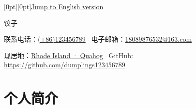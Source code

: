 \documentclass[a4paper,10pt]{article}
\begin{document}
\hspace*{-2.5em} 
\vspace*{2.5em}
\raisebox{0pt}[0pt][0pt]{\hyperref[english-version]{\small{Jump to English version}}}
\vspace*{-\baselineskip}

\centerline{\Huge{\kaishu 饺子}}
\vspace{0.5em}
\label{中文版}
\centerline{{联系电话：\href{tel:(+86)123456789}{(+86)123456789} 
\textperiodcentered \  电子邮箱：\href{mailto:18089876532@163.com}{18089876532@163.com}}}
\centerline{{现居地：\href{https://ditu.amap.com/search?query=Rhode Island · Quahog}{Rhode Island · Quahog}
\textperiodcentered \ GitHub: \href{https://github.com/dumplings123456789}{https://github.com/dumplings123456789}}}
\hfill {}

\section*{\textbf{个人简介}}
 
\subsection*{}
\subsection*{}
\end{document}
